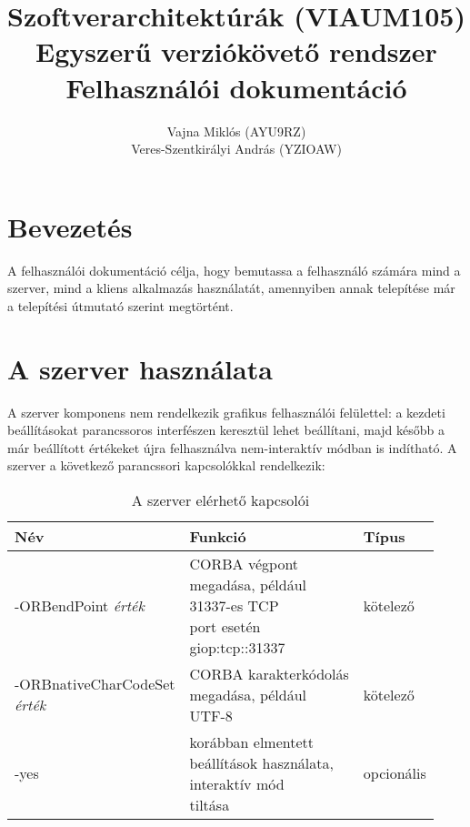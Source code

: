 \documentclass[a4paper,12pt]{article}
\title{Szoftverarchitektúrák (VIAUM105)\\Egyszerű verziókövető rendszer\\Felhasználói dokumentáció}
\author{Vajna Miklós (AYU9RZ)\\Veres-Szentkirályi András (YZIOAW)}
\begin{document}
\maketitle
\thispagestyle{empty}
\lstset{numbers=left, numberstyle=\tiny, basicstyle=\ttfamily, breaklines=true, frame=single, tabsize=2}

\pagebreak
\onehalfspacing
\section{Bevezetés}

A felhasználói dokumentáció célja, hogy bemutassa a felhasználó számára mind a
szerver, mind a kliens alkalmazás használatát, amennyiben annak telepítése
már a telepítési útmutató szerint megtörtént.

\section{A szerver használata}

A szerver komponens nem rendelkezik grafikus felhasználói felülettel: a kezdeti
beállításokat parancssoros interfészen keresztül lehet beállítani, majd később
a már beállított értékeket újra felhasználva nem-interaktív módban is
indítható. A szerver a következő parancssori kapcsolókkal rendelkezik:

\begin{center}
\begin{table}[H]
\centering
\begin{tabular}{| l | l | l |}
\hline
Név & Funkció & Típus \\ \hline
-ORBendPoint \emph{érték} & \makecell[l]{CORBA végpont \\ megadása, például \\ 31337-es  TCP \\ port esetén\\ giop:tcp::31337} & kötelező \\
\hline
\makecell[l]{-ORBnativeCharCodeSet \\ \emph{érték}} & \makecell[l]{CORBA karakterkódolás \\ megadása, például \\ UTF-8} & kötelező \\
\hline
-yes & \makecell[l]{korábban elmentett \\ beállítások használata, \\ interaktív mód \\ tiltása} & opcionális \\
\hline
\end{tabular}
\caption{A szerver elérhető kapcsolói}
\end{table}
\end{center}
\end{document}
